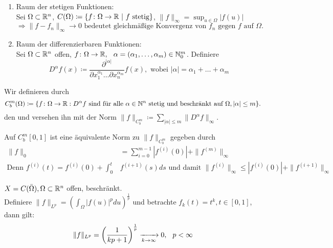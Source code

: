 \begin{beispiel}
	\begin{enumerate}[label=\alph*\upshape)]
		\item Raum der stetigen Funktionen:  \\
		Sei $\Omega \subset \mathbb{R}^{n}$, $C(\Omega) \coloneqq \{ f \colon \Omega \rightarrow \mathbb{R} \text{ | } f \text{ stetig} \}$, $\| f \|_{\infty} = \sup_{u \in \Omega} |f(u)|$
		\[ \Rightarrow \| f - f_{n} \|_{\infty} \rightarrow 0 \text{ bedeutet gleichmä{\ss}ige Konvergenz von } f_{n} \text{ gegen } f \text{ auf } \Omega. \]
		\item Raum der differenzierbaren Funktionen:  \\
		Sei $\Omega \subset \mathbb{R}^{n}$ offen, $f \colon \Omega \rightarrow \mathbb{R}, \hspace{0.25cm} \alpha = (\alpha_{1}, \dotsc, \alpha_{m}) \in \mathbb{N}_{0}^{m}$. Definiere
		\[ D^{\alpha}f(x) \coloneqq \frac{ \partial^{ | \alpha | } }{ \partial x_{1}^{ \alpha_{1} } \dotsc \partial x_{n}^{ \alpha_{m} } } f(x), \text{ wobei } | \alpha | = \alpha_{1} + \dotsc + \alpha_{m} \] 
	\end{enumerate}
\end{beispiel}


\begin{definition}
	Wir definieren durch
		\[ C_{b}^{m}(\Omega) \coloneqq \{ f \colon \Omega \rightarrow \mathbb{R} : D^{\alpha}f \text{ sind für alle } \alpha \in \mathbb{N}^{n} \text{ stetig und beschränkt auf } \Omega, |\alpha| \leq m \}. \]	
	den  und versehen ihn mit der Norm $\| f \|_{C_{b}^{m}} \coloneqq \sum_{|\alpha| \leq m} \| D^{\alpha}f \|_{\infty}$.
\end{definition}


\begin{bemerkung}
	Auf $C_{b}^{m} [0, 1]$ ist eine äquivalente Norm zu  $\| f \|_{C_{b}^{m}}$ gegeben durch
	\begin{align*}
		\| f \|_{0} & = \sum_{i = 0}^{m - 1} |f^{(i)}(0)| + \| f^{(m)} \|_{\infty} \\
		\text{Denn } f^{(i)}(t) = f^{(i)}(0) + \int_{0}^{t} & f^{(i + 1)}(s) ds \text{ und damit } \| f^{(i)}\|_{\infty} \leq | f^{(i)}(0) | + \| f^{(i + 1)}\|_{\infty}	
	\end{align*}
\end{bemerkung}


\begin{beispiel}
	$X = C(\bar\Omega), \Omega \subset \mathbb{R}^{n}$ offen, beschränkt. \\
	Definiere $\| f \|_{L^{p}} = \left( \int_{\Omega} |f(u)|^{p} du \right)^{\frac{1}{p}}$ und betrachte $f_{k}(t) = t^k, t \in [0, 1]$, dann gilt:
 	\[ \| f \|_{L^{p}} = \left( \frac{1}{kp + 1} \right)^{\frac{1}{p}} \xrightarrow[k \rightarrow \infty]{} 0, \hspace{0.25cm} p < \infty \]
\end{beispiel}


